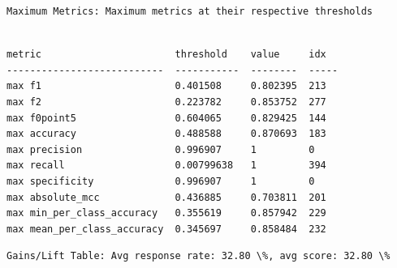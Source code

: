 \documentclass[11pt]{article}
\begin{document}
    
    \begin{Verbatim}[commandchars=\\\{\}]
Maximum Metrics: Maximum metrics at their respective thresholds


    \end{Verbatim}

    
    \begin{verbatim}
metric                       threshold    value     idx
---------------------------  -----------  --------  -----
max f1                       0.401508     0.802395  213
max f2                       0.223782     0.853752  277
max f0point5                 0.604065     0.829425  144
max accuracy                 0.488588     0.870693  183
max precision                0.996907     1         0
max recall                   0.00799638   1         394
max specificity              0.996907     1         0
max absolute_mcc             0.436885     0.703811  201
max min_per_class_accuracy   0.355619     0.857942  229
max mean_per_class_accuracy  0.345697     0.858484  232
    \end{verbatim}

    
    \begin{Verbatim}[commandchars=\\\{\}]
Gains/Lift Table: Avg response rate: 32.80 \%, avg score: 32.80 \%


    \end{Verbatim}
\end{document}
